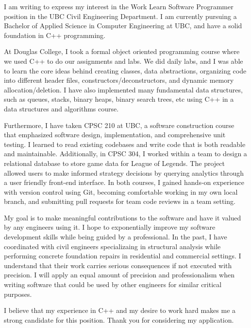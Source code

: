 I am writing to express my interest in the Work Learn Software Programmer position in the UBC Civil Engineering Department.
I am currently pursuing a Bachelor of Applied Science in Computer Engineering at UBC, and have a solid foundation in
C++ programming.

At Douglas College, I took a formal object oriented programming course where we used C++ to do our assignments and labs.
We did daily labs, and I was able to learn the core ideas behind creating classes, data abstractions, organizing code into
different header files, constructors/deconstructors, and dynamic memory allocation/deletion. I have also implemented many
fundamental data structures, such as queues, stacks, binary heaps, binary search trees, etc using C++ in a data structures and
algorithms course.


Furthermore, I have taken CPSC 210 at UBC, a software construction course that emphasized software design, implementation,
and comprehensive unit testing. I learned to read existing codebases and write code that is both readable
and maintainable. Additionally, in CPSC 304, I worked within a team to design a relational database to store game
data for League of Legends. The project allowed users to make informed strategy decisions by querying analytics through a user friendly front-end
interface. In both courses, I gained hands-on experience with version control using Git, becoming comfortable working in my own
local branch, and submitting pull requests for team code reviews in a team setting.

My goal is to make meaningful contributions to the software and have it valued by any engineers
using it. I hope to exponentially improve my software development skills while being guided by a professional. In the past, I have coordinated with civil engineers
specializaing in structural analysis while performing concrete foundation repairs in residential and commercial settings. I understand that
their work carries serious consequences if not executed with precision. I will apply an equal amount of precision and professionalism when writing software
that could be used by other engineers for similar critical purposes.

I believe that my experience in C++ and my desire to work hard makes me a strong candidate for this position. Thank you for
considering my application.



